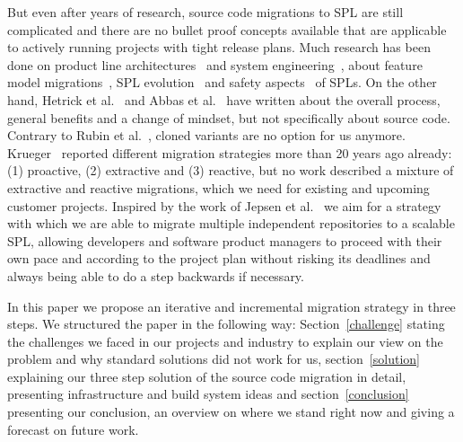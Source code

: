 But even after years of research, source code migrations to SPL are still
complicated and there are no bullet proof concepts available that are applicable
to actively running projects with tight release plans. Much research has been
done on product line architectures~\cite{Svahnberg1999EPLA,
confsplcTomashchukLJ21} and system engineering~\cite{confsplcSchaferBAKR21},
about feature model migrations~\cite{ncstrlustuttgartfiINPROC200185,
confsplcGrunerBKR20, confsplcDuszynskiDB19, confsplcFritschAR20}, SPL
evolution~\cite{journalssmrQuintonVRBGS21, Svahnberg1999ESPL, Eise02b,
kconfigKernel} and safety aspects~\cite{confsplcWolschke0SAM19} of SPLs. On the
other hand, Hetrick et al.~\cite{confoopslaHetrickKM06} and Abbas et
al.~\cite{confsplcAbbasJLESS20} have written about the overall process, general
benefits and a change of mindset, but not specifically about source code.
Contrary to Rubin et al.~\cite{confsplcRubinCC13}, cloned variants are no option
for us anymore. Krueger~\cite{Krueger2001SMC} reported different migration
strategies more than 20 years ago already: (1) proactive, (2) extractive and (3)
reactive, but no work described a mixture of extractive and reactive migrations,
which we need for existing and upcoming customer projects. Inspired by the work
of Jepsen et al.~\cite{confsplcJepsenDB07} we aim for a strategy with which we
are able to migrate multiple independent repositories to a scalable SPL,
allowing developers and software product managers to proceed with their own pace
and according to the project plan without risking its deadlines and always being
able to do a step backwards if necessary.

In this paper we propose an iterative and incremental migration strategy in
three steps. We structured the paper in the following way:
Section~\ref{challenge} stating the challenges we faced in our projects and
industry to explain our view on the problem and why standard solutions did not
work for us, section~\ref{solution} explaining our three step solution of the
source code migration in detail, presenting infrastructure and build system
ideas and section~\ref{conclusion} presenting our conclusion, an overview on
where we stand right now and giving a forecast on future work.
